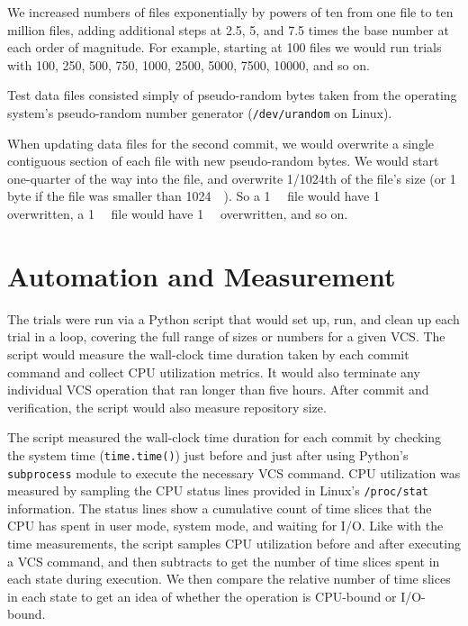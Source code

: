 We increased numbers of files exponentially by powers of ten from one file to
ten million files, adding additional steps at \num{2.5}, \num{5}, and \num{7.5}
times the base number at each order of magnitude. For example, starting at
\num{100} files we would run trials with \num{100}, \num{250}, \num{500},
\num{750}, \num{1000}, \num{2500}, \num{5000}, \num{7500}, \num{10000}, and so
on.

Test data files consisted simply of pseudo-random bytes taken from the operating
system's pseudo-random number generator (\lstinline{/dev/urandom} on Linux).

When updating data files for the second commit, we would overwrite a single
contiguous section of each file with new pseudo-random bytes. We would start
one-quarter of the way into the file, and overwrite \num{1/1024}th of the file's
size (or 1 byte if the file was smaller than \SI{1024}{\kibi\byte}). So a
\SI{1}{\mebi\byte} file would have \SI{1}{\kibi\byte} overwritten, a
\SI{1}{\gibi\byte} file would have \SI{1}{\mebi\byte} overwritten, and so on.


\section{Automation and Measurement}

The trials were run via a Python script that would set up, run, and clean up
each trial in a loop, covering the full range of sizes or numbers for a given
VCS. The script would measure the wall-clock time duration taken by each commit
command and collect CPU utilization metrics. It would also terminate any
individual VCS operation that ran longer than five hours. After commit and
verification, the script would also measure repository size.

The script measured the wall-clock time duration for each commit by checking the
system time (\lstinline{time.time()}) just before and just after using Python's
\lstinline{subprocess} module to execute the necessary VCS command. CPU
utilization was measured by sampling the CPU status lines provided in Linux's
\lstinline{/proc/stat} information. The status lines show a cumulative count of
time slices that the CPU has spent in user mode, system mode, and waiting for
I/O. Like with the time measurements, the script samples CPU utilization before
and after executing a VCS command, and then subtracts to get the number of time
slices spent in each state during execution. We then compare the relative number
of time slices in each state to get an idea of whether the operation is
CPU-bound or I/O-bound.

